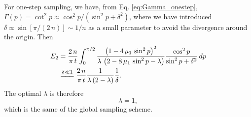 \documentclass[reprint]{revtex4-1}
\newcommand{\Err}{E}
\begin{document}
For one-step sampling,
we have, from Eq. \eqref{eq:Gamma_onestep},
$\Gamma(p) = \cot^2 p \approx \cos^2 p / (\sin^2 p + \delta^2)$,
where we have introduced
$\delta \propto \sin[ \pi / (2 \, n) ] \sim 1/n$
as a small parameter to avoid the divergence
around the origin.
%
Then
$$
\begin{aligned}
\Err_2
&=
\frac{   2 \, n }
     { \pi \, t }
\int_0^{\pi/2}
    \frac{            \left(1 - 4 \, \mu_1 \, \sin^2 p \right)^2         }
         { \lambda \, \left(2 - 8 \, \mu_1 \, \sin^2 p - \lambda \right) }
    \frac{ \cos^2 p }
         { \sin^2 p + \delta^2 }
\, dp
\notag \\
&
\stackrel{    \delta \ll 1     }
         { =\joinrel=\joinrel= }
\frac{   2 \, n }
     { \pi \, t }
\frac{             1             }
     {  \lambda \, (2 - \lambda) }
\frac{    1   }
     { \delta }
.
\end{aligned}
$$
%
The optimal $\lambda$ is therefore
%
\begin{equation}
\lambda = 1,
\label{eq:lambda_tridiag_onestep}
\end{equation}
%
which is the same of the global sampling scheme.
\end{document}

